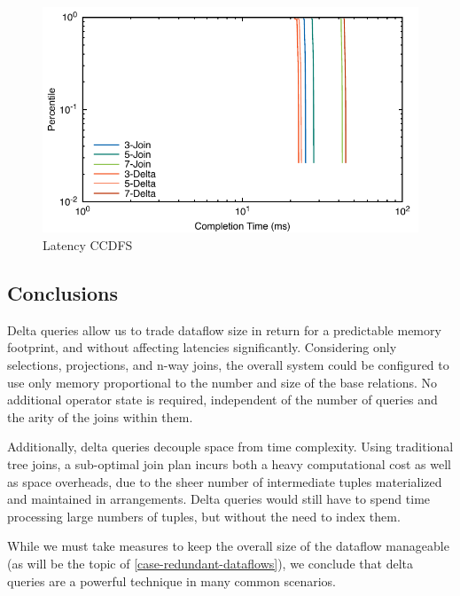 \documentclass[../catalog.tex]{subfiles}
\begin{document}
\begin{figure}[h!]
  \includegraphics[width=1.0\linewidth]{results/join-state/out/all_cdfs}
  \caption{Latency CCDFS}
  \label{fig:arity-latencies}
\end{figure}

\subsection{Conclusions}

Delta queries allow us to trade dataflow size in return for a
predictable memory footprint, and without affecting latencies
significantly. Considering only selections, projections, and n-way
joins, the overall system could be configured to use only memory
proportional to the number and size of the base relations. No
additional operator state is required, independent of the number of
queries and the arity of the joins within them.

Additionally, delta queries decouple space from time complexity. Using
traditional tree joins, a sub-optimal join plan incurs both a heavy
computational cost as well as space overheads, due to the sheer number
of intermediate tuples materialized and maintained in
arrangements. Delta queries would still have to spend time processing
large numbers of tuples, but without the need to index them.

While we must take measures to keep the overall size of the dataflow
manageable (as will be the topic of
\autoref{case-redundant-dataflows}), we conclude that delta queries
are a powerful technique in many common scenarios.
\end{document}
